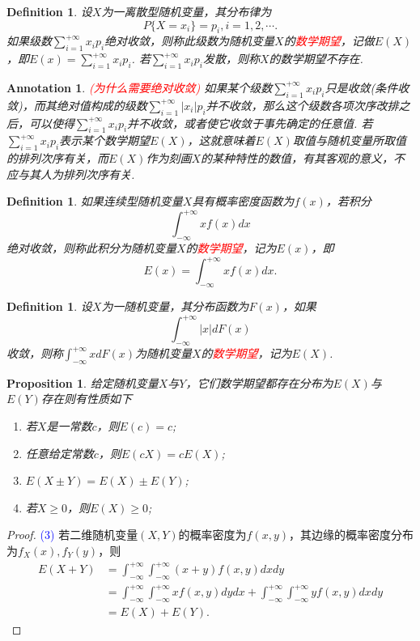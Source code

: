 \documentclass{article}
\newtheorem{proposition}[theorem]{Proposition}
\newtheorem{definition}[theorem]{Definition}
\newtheorem{annotation}[theorem]{Annotation}
\newcommand{\redt}[1]{\textcolor{red}{#1}}
\newcommand{\bluet}[1]{\textcolor{blue}{#1}}
\begin{document}
\begin{definition}
\rm 设$X$为一离散型随机变量，其分布律为
$$
P\{X=x_i\} = p_i, i= 1,2,\cdots.
$$
如果级数$\sum\limits_{i=1}^{+\infty}x_ip_i$绝对收敛，则称此级数为随机变量$X$的\redt{数学期望}，记做$E(X)$，即$E(x) = \sum\limits_{i=1}^{+\infty}x_ip_i$. 若$\sum\limits_{i=1}^{+\infty}x_ip_i$发散，则称$X$的数学期望不存在. 
\end{definition}

\begin{annotation}
\rm \redt{(为什么需要绝对收敛)} 如果某个级数$\sum\limits_{i=1}^{+\infty}x_ip_i$只是收敛(条件收敛)，而其绝对值构成的级数$\sum\limits_{i=1}^{+\infty}|x_i|p_i$并不收敛，那么这个级数各项次序改排之后，可以使得$\sum\limits_{i=1}^{+\infty}x_ip_i$并不收敛，或者使它收敛于事先确定的任意值. 若$\sum\limits_{i=1}^{+\infty}x_ip_i$表示某个数学期望$E(X)$，这就意味着$E(X)$取值与随机变量所取值的排列次序有关，而$E(X)$作为刻画$X$的某种特性的数值，有其客观的意义，不应与其人为排列次序有关.
\end{annotation}

\begin{definition}
\rm 如果连续型随机变量$X$具有概率密度函数为$f(x)$，若积分
$$
\int_{-\infty}^{+\infty} xf(x)dx
$$
绝对收敛，则称此积分为随机变量$X$的\redt{数学期望}，记为$E(x)$，即
$$
E(x) = \int_{-\infty}^{+\infty} xf(x)dx. 
$$
\end{definition}

\begin{definition}
\rm 设$X$为一随机变量，其分布函数为$F(x)$，如果
$$
\int_{-\infty}^{+\infty} |x|dF(x)
$$
收敛，则称$\int_{-\infty}^{+\infty} xdF(x)$为随机变量$X$的\redt{数学期望}，记为$E(X)$. 
\end{definition}

\begin{proposition}
\rm 给定随机变量$X$与$Y$，它们数学期望都存在分布为$E(X)$与$E(Y)$存在则有性质如下
\begin{enumerate}
	\item 若$X$是一常数$c$，则$E(c) = c$;
	\item 任意给定常数$c$，则$E(cX) = cE(X)$;
	\item $E(X\pm Y) = E(X)\pm E(Y)$;
	\item 若$X \geq 0$，则$E(X) \geq 0$;
\end{enumerate}
\end{proposition}

\begin{proof}
\bluet{(3)} 若二维随机变量$(X,Y)$的概率密度为$f(x,y)$，其边缘的概率密度分布为$f_X(x),f_Y(y)$，则
$$
\begin{array}{ll}
E(X+Y)&=\int_{-\infty}^{+\infty}\int_{-\infty}^{+\infty}(x+y)f(x,y)dxdy \\
&= \int_{-\infty}^{+\infty}\int_{-\infty}^{+\infty}xf(x,y)dydx + \int_{-\infty}^{+\infty}\int_{-\infty}^{+\infty}yf(x,y)dxdy \\
&= E(X) + E(Y).
\end{array}
$$
\end{proof}
\end{document}
